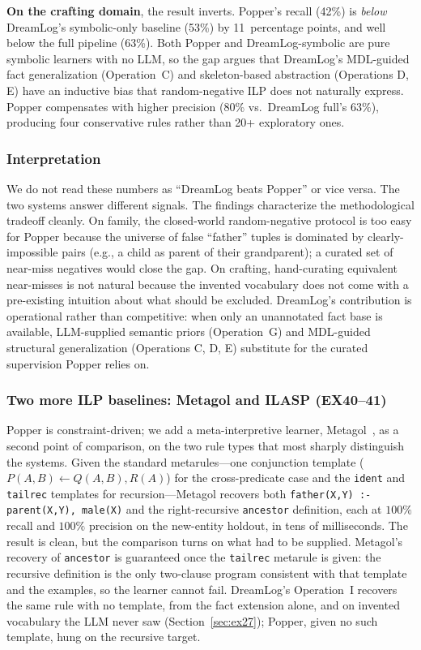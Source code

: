 \documentclass[10pt,conference]{IEEEtran}
\begin{document}
\textbf{On the crafting domain}, the result inverts. Popper's recall (42\%) is \emph{below} DreamLog's symbolic-only baseline (53\%) by 11~percentage points, and well below the full pipeline (63\%). Both Popper and DreamLog-symbolic are pure symbolic learners with no LLM, so the gap argues that DreamLog's MDL-guided fact generalization (Operation~C) and skeleton-based abstraction (Operations D, E) have an inductive bias that random-negative ILP does not naturally express. Popper compensates with higher precision (80\% vs.\ DreamLog full's 63\%), producing four conservative rules rather than 20+ exploratory ones.

\subsubsection{Interpretation}
We do not read these numbers as ``DreamLog beats Popper'' or vice versa. The two systems answer different signals. The findings characterize the methodological tradeoff cleanly. On family, the closed-world random-negative protocol is too easy for Popper because the universe of false ``father'' tuples is dominated by clearly-impossible pairs (e.g., a child as parent of their grandparent); a curated set of near-miss negatives would close the gap. On crafting, hand-curating equivalent near-misses is not natural because the invented vocabulary does not come with a pre-existing intuition about what should be excluded. DreamLog's contribution is operational rather than competitive: when only an unannotated fact base is available, LLM-supplied semantic priors (Operation~G) and MDL-guided structural generalization (Operations C, D, E) substitute for the curated supervision Popper relies on.

\subsubsection{Two more ILP baselines: Metagol and ILASP (EX40--41)}
Popper is constraint-driven; we add a meta-interpretive learner, Metagol~\cite{muggleton2014meta}, as a second point of comparison, on the two rule types that most sharply distinguish the systems. Given the standard metarules---one conjunction template ($P(A,B) \leftarrow Q(A,B), R(A)$) for the cross-predicate case and the \texttt{ident} and \texttt{tailrec} templates for recursion---Metagol recovers both \texttt{father(X,Y) :- parent(X,Y), male(X)} and the right-recursive \texttt{ancestor} definition, each at $100\%$ recall and $100\%$ precision on the new-entity holdout, in tens of milliseconds. The result is clean, but the comparison turns on what had to be supplied. Metagol's recovery of \texttt{ancestor} is guaranteed once the \texttt{tailrec} metarule is given: the recursive definition is the only two-clause program consistent with that template and the examples, so the learner cannot fail. DreamLog's Operation~I recovers the same rule with no template, from the fact extension alone, and on invented vocabulary the LLM never saw (Section~\ref{sec:ex27}); Popper, given no such template, hung on the recursive target.
\end{document}
